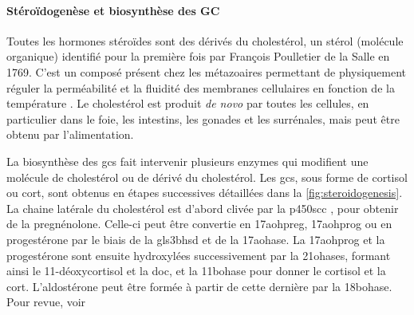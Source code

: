 \documentclass[../main.tex]{subfiles}
\begin{document}
\paragraph{Stéroïdogenèse et biosynthèse des GC}
Toutes les hormones stéroïdes sont des dérivés du cholestérol, un stérol (molécule organique) identifié pour la première fois par François Poulletier de la Salle en 1769.
C'est un composé présent chez les métazoaires permettant de physiquement réguler la perméabilité et la fluidité des membranes cellulaires en fonction de la température \citep{Cooper1978}.
Le cholestérol est produit \textit{de novo} par toutes les cellules, en particulier dans le foie, les intestins, les gonades et les surrénales, mais peut être obtenu par l'alimentation.
\par
%
%

La biosynthèse des \glspl{gc} fait intervenir plusieurs enzymes qui modifient une molécule de cholestérol ou de dérivé du cholestérol.
Les \glspl{gc}, sous forme de cortisol ou \gls{cort}, sont obtenus en étapes successives détaillées dans la \autoref{fig:steroidogenesis}.
La chaine latérale du cholestérol est d'abord clivée par la \gls{p450scc} \citep{Chung1986}, pour obtenir de la pregnénolone.
Celle-ci peut être convertie en \gls{17aohpreg}, \gls{17aohprog} ou en progestérone par le biais de la gls{3bhsd} et de la \gls{17aohase}.
La \gls{17aohprog} et la progestérone sont ensuite hydroxylées successivement par la \glspl{21ohase}, formant ainsi le 11-déoxycortisol et la \gls{doc}, et la \gls{11bohase} pour donner le cortisol et la \gls{cort}.
L'aldostérone peut être formée à partir de cette dernière par la \gls{18bohase}.
Pour revue, voir \citep{Ghayee2007}


\end{document}
